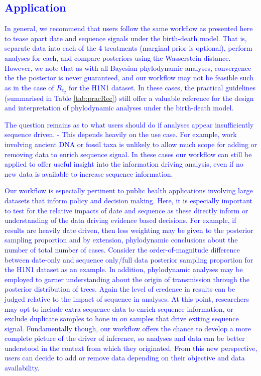 \documentclass{article}
\begin{document}
\subsection*{\textcolor{blue}{Application}}
\textcolor{blue}{
In general, we recommend that users follow the same workflow as presented here to tease apart date and sequence signals under the birth-death model. That is, separate data into each of the 4 treatments (marginal prior is optional), perform analyses for each, and compare posteriors using the Wasserstein distance. However, we note that as with all Bayesian phylodynamic analyses, convergence the the posterior is never guaranteed, and our workflow may not be feasible such as in the case of $R_{e_2}$ for the H1N1 dataset. In these cases, the practical guidelines (summarised in Table \ref{tab:pracRec}) still offer a valuable reference for the design and interpretation of phylodynamic analyses under the birth-death model.}

\textcolor{blue}{The question remains as to what users should do if analyses appear insufficiently sequence driven. - This depends heavily on the use case. For example, work involving ancient DNA or fossil taxa is unlikely to allow much scope for adding or removing data to enrich sequence signal. In these cases our workflow can still be applied to offer useful insight into the information driving analysis, even if no new data is available to increase sequence information.}

\textcolor{blue}{Our workflow is especially pertinent to public health applications involving large datasets that inform policy and decision making. Here, it is especially important to test for the relative impacts of date and sequence as these directly inform or understanding of the data driving evidence based decisions. For example, if results are heavily date driven, then less weighting may be given to the posterior sampling proportion and by extension, phylodynamic conclusions about the number of total number of cases. Consider the order-of-magnitude difference between date-only and sequence only/full data posterior sampling proportion for the H1N1 dataset as an example. In addition, phylodynamic analyses may be employed to garner understanding about the origin of transmission through the posterior distribution of trees. Again the level of credence in results can be judged relative to the impact of sequence in analyses. At this point, researchers may opt to include extra sequence data to enrich sequence information, or exclude duplicate samples to hone in on samples that drive exiting sequence signal. Fundamentally though, our workflow offers the chance to develop a more complete picture of the driver of inference, so analyses and data can be better understood in the context from which they originated. From this new perspective, users can decide to add or remove data depending on their objective and data availability.}
\end{document}
